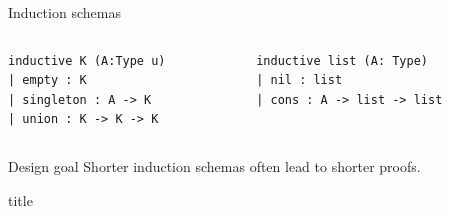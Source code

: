 \documentclass{beamer}
\begin{document}
\begin{frame}[fragile]{Induction schemas}
    \begin{columns}[T]
        \begin{column}{0.5\textwidth}
            \begin{lstlisting}
inductive K (A:Type u)
| empty : K
| singleton : A -> K
| union : K -> K -> K
            \end{lstlisting}
        \end{column}
        
        \begin{column}{0.5\textwidth}
            \begin{lstlisting}
inductive list (A: Type)
| nil : list
| cons : A -> list -> list
            \end{lstlisting}
        \end{column}
    \end{columns}
    \begin{block}{Design goal}
        Shorter induction schemas often lead to shorter proofs.
    \end{block}
\end{frame}

\begin{frame}{title}
    
\end{frame}
    
\end{document}
